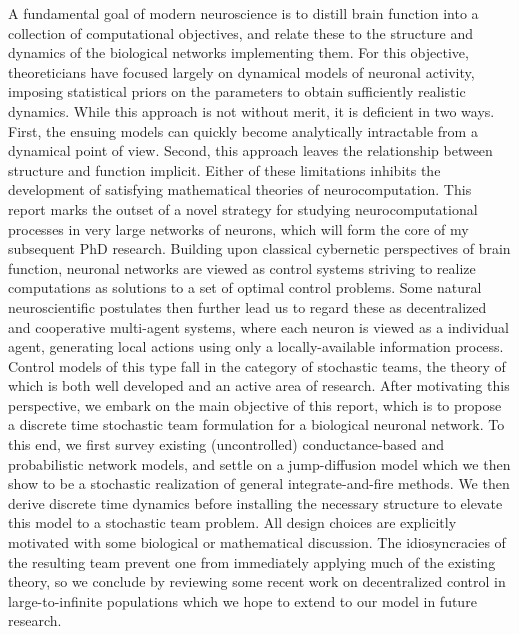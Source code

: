 \documentclass[12pt, oneside]{report}
\newcommand{\1}[1]{\mathbbm{1}_{\{#1\}}}
\theoremstyle{definition}
\begin{document}
A fundamental goal of modern neuroscience is to distill brain function into a
collection of computational objectives, and relate these to the structure and
dynamics of the biological networks implementing them. For this objective,
theoreticians have focused largely on dynamical models of neuronal activity,
imposing statistical priors on the parameters to obtain sufficiently realistic
dynamics. While this approach is not without merit, it is deficient in two ways.
First, the ensuing models can quickly become analytically intractable from a
dynamical point of view. Second, this approach leaves the relationship between
structure and function implicit. Either of these limitations inhibits the
development of satisfying mathematical theories of neurocomputation. This report marks the outset of a novel
strategy for studying neurocomputational processes in very large networks of
neurons, which will form the core of my subsequent PhD research. Building upon classical cybernetic perspectives of brain function,
neuronal networks are viewed as control systems striving to realize computations
as solutions to a set of optimal control problems. Some natural neuroscientific
postulates then further lead us to regard these as decentralized and cooperative
multi-agent systems, where each neuron is viewed as a individual agent,
generating local actions using only a locally-available information process. Control models
of this type fall in the category of stochastic teams, the theory of which is both well developed
and an active area of research. After motivating this perspective, we embark on the main objective of this report, which is to propose a discrete time stochastic team formulation for a biological neuronal network.
To this end, we first survey existing (uncontrolled) conductance-based and probabilistic network models,
and settle on a jump-diffusion model which we then show to be a stochastic realization of general integrate-and-fire methods. We then derive discrete time dynamics before
installing the necessary structure to elevate this model to a stochastic team problem. All design choices are explicitly motivated with some
biological or mathematical discussion. The idiosyncracies of the resulting team prevent one from immediately applying much of the existing theory,
so we conclude by reviewing some recent work on decentralized control in large-to-infinite populations which we hope to extend to
our model in future research.
\newpage
\begin{center}
    \\[5pt]
\end{center}
\end{document}
